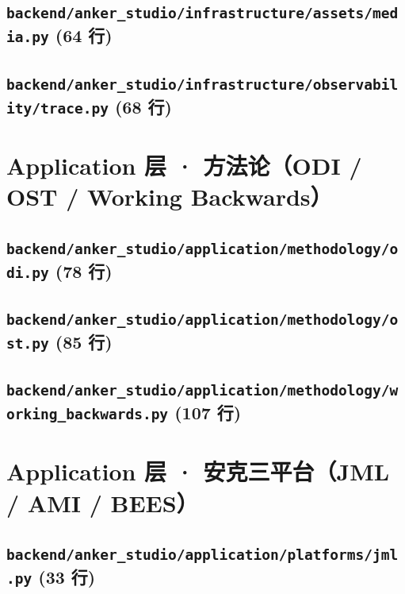 \subsection*{\texttt{backend/anker\_studio/infrastructure/assets/media.py} \hfill \normalfont\small (64 行)}


\subsection*{\texttt{backend/anker\_studio/infrastructure/observability/trace.py} \hfill \normalfont\small (68 行)}


\section{Application 层 · 方法论（ODI / OST / Working Backwards）}
\subsection*{\texttt{backend/anker\_studio/application/methodology/odi.py} \hfill \normalfont\small (78 行)}


\subsection*{\texttt{backend/anker\_studio/application/methodology/ost.py} \hfill \normalfont\small (85 行)}


\subsection*{\texttt{backend/anker\_studio/application/methodology/working\_backwards.py} \hfill \normalfont\small (107 行)}


\section{Application 层 · 安克三平台（JML / AMI / BEES）}
\subsection*{\texttt{backend/anker\_studio/application/platforms/jml.py} \hfill \normalfont\small (33 行)}


